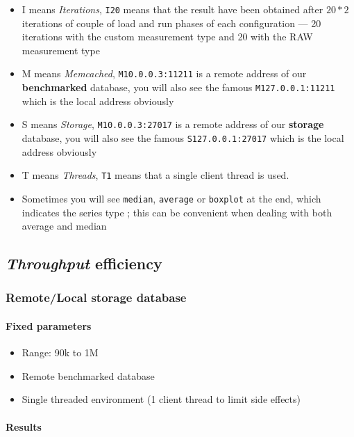 \documentclass[a4paper,11pt]{report}
\begin{document}
\begin{itemize}
\item
I means \textit{Iterations}, \texttt{I20} means that the result have been obtained after $20*2$ iterations of couple of load and run phases of each configuration --- 20 iterations with the custom measurement type and 20 with the RAW measurement type
\item
M means \textit{Memcached}, \texttt{M10.0.0.3:11211} is a remote address of our \textbf{benchmarked} database, you will also see the famous \texttt{M127.0.0.1:11211} which is the local address obviously
\item
S means \textit{Storage}, \texttt{M10.0.0.3:27017} is a remote address of our \textbf{storage} database, you will also see the famous \texttt{S127.0.0.1:27017} which is the local address obviously
\item
T means \textit{Threads}, \texttt{T1} means that a single client thread is used.
\item
Sometimes you will see \texttt{median}, \texttt{average} or \texttt{boxplot} at the end, which indicates the series type ; this can be convenient when dealing with both average and median
\end{itemize}

\subsection{\textit{Throughput} efficiency}

\subsubsection{Remote/Local storage database}

\paragraph{Fixed parameters}
\begin{itemize}
\item
Range: 90k to 1M
\item
Remote benchmarked database
\item
Single threaded environment (1 client thread to limit side effects)
\end{itemize}

\paragraph{Results}
\end{document}
